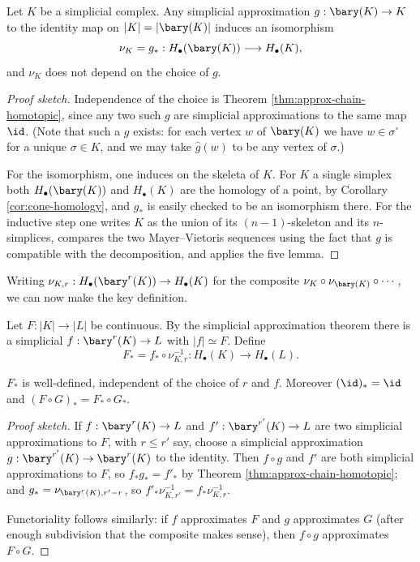 \begin{theorem} \label{thm:nu}
	Let $K$ be a simplicial complex. Any simplicial approximation $g: \bary(K)\to K$ to the identity map on $|K| = |\bary(K)|$ induces an isomorphism
	$$
	\nu_K = g_*: H_\bullet(\bary(K)) \longrightarrow H_\bullet(K),
	$$
	and $\nu_K$ does not depend on the choice of $g$.
\end{theorem}
\begin{proof}[Proof sketch]
	Independence of the choice is Theorem \ref{thm:approx-chain-homotopic}, since any two such $g$ are simplicial approximations to the same map $\id$. (Note that such a $g$ exists: for each vertex $w$ of $\bary(K)$ we have $w \in \sigma^\circ$ for a unique $\sigma\in K$, and we may take $\hat g(w)$ to be any vertex of $\sigma$.)

	For the isomorphism, one induces on the skeleta of $K$. For $K$ a single simplex both $H_\bullet(\bary(K))$ and $H_\bullet(K)$ are the homology of a point, by Corollary \ref{cor:cone-homology}, and $g_*$ is easily checked to be an isomorphism there. For the inductive step one writes $K$ as the union of its $(n-1)$-skeleton and its $n$-simplices, compares the two Mayer--Vietoris sequences using the fact that $g$ is compatible with the decomposition, and applies the five lemma.
\end{proof}

Writing $\nu_{K,r}: H_\bullet(\bary^r(K))\to H_\bullet(K)$ for the composite
$\nu_K \circ \nu_{\bary(K)}\circ\cdots$, we can now make the key definition.

\begin{definition} \label{def:induced-homology}
	Let $F: |K|\to|L|$ be continuous. By the simplicial approximation theorem there is a simplicial $f: \bary^r(K)\to L$ with $|f|\simeq F$. Define
	$$
	F_* = f_* \circ \nu_{K,r}^{-1}: H_\bullet(K) \longrightarrow H_\bullet(L).
	$$
\end{definition}

\begin{theorem} \label{thm:functorial-homology}
	$F_*$ is well-defined, independent of the choice of $r$ and $f$. Moreover $(\id)_* = \id$ and $(F\circ G)_* = F_*\circ G_*$.
\end{theorem}
\begin{proof}[Proof sketch]
	If $f: \bary^r(K)\to L$ and $f': \bary^{r'}(K)\to L$ are two simplicial approximations to $F$, with $r \leq r'$ say, choose a simplicial approximation $g: \bary^{r'}(K)\to\bary^r(K)$ to the identity. Then $f\circ g$ and $f'$ are both simplicial approximations to $F$, so $f_*g_* = f'_*$ by Theorem \ref{thm:approx-chain-homotopic}; and $g_* = \nu_{\bary^r(K), r'-r}$, so $f'_*\nu_{K,r'}^{-1} = f_*\nu_{K,r}^{-1}$.

	Functoriality follows similarly: if $f$ approximates $F$ and $g$ approximates $G$ (after enough subdivision that the composite makes sense), then $f\circ g$ approximates $F \circ G$.
\end{proof}

